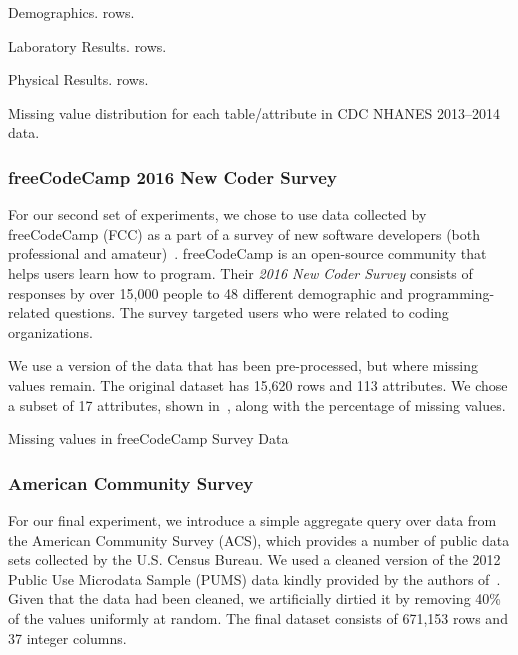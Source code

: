 \begin{table}
  \centering
  \begin{subtable}{0.5\textwidth}
    \centering
    
    \caption{Demographics. \demorows{} rows.}
  \end{subtable}
  \par\medskip
  \begin{subtable}{0.5\textwidth}
    \centering
    
    \caption{Laboratory Results. \labexrows{} rows.}
  \end{subtable}
  \par\medskip  
  \begin{subtable}{0.5\textwidth}
    \centering
    
    \caption{Physical Results. \labexrows{} rows.}
  \end{subtable}
  \par\medskip  
  \caption{Missing value distribution for each table/attribute in CDC NHANES 2013--2014 data.}\label{table:nhanes-description} 
\end{table}

\subsubsection{freeCodeCamp 2016 New Coder Survey}
For our second set of experiments, we chose to use data collected
by freeCodeCamp (FCC) as a part of a survey of new software developers
(both professional and amateur)~\cite{fcc-data}. freeCodeCamp is an open-source
community that helps users learn how to program. Their \textit{2016 New Coder Survey} consists of responses by over 15,000 people to 48 different
demographic and programming-related questions.
The survey targeted users who were related to coding organizations.

We use a version of the data that has been pre-processed, but where missing values remain.
The original dataset has 15,620 rows and 113 attributes.
We chose a subset of 17 attributes, shown in~, along with the percentage of missing values.

\begin{table}
  \centering
  
  \caption{Missing values in freeCodeCamp Survey Data}\label{table:fcc-description} 
\end{table}

\subsubsection{American Community Survey}
For our final experiment, we introduce a simple aggregate query over data from the American Community Survey (ACS), which
provides a number of public data sets collected by the U.S. Census Bureau.
We used a cleaned version of the 2012 Public Use Microdata Sample (PUMS) data kindly provided by the authors of~\cite{akande2015empirical}.
Given that the data had been cleaned, we artificially dirtied it by removing 40\% of the values uniformly at random.
The final dataset consists of 671,153 rows and 37 integer columns.

